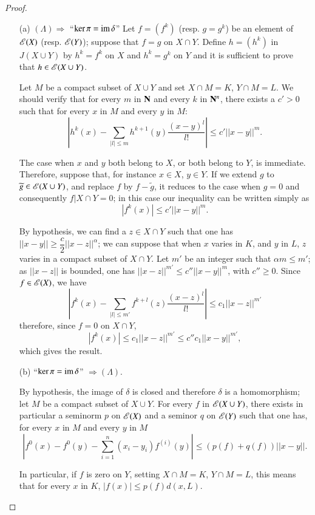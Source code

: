 \begin{proof}
\begin{itemize}
\item[(a)] $(\Lambda)\Rightarrow$ ``$\ker \pi=\operatorname{im} \delta$'' Let $f=(f^{k})$ (resp. $g=g^{k}$) be an element of $\mathscr{E}(X)$ (resp. $\mathscr{E}(Y)$); suppose that $f=g$ on $X\cap Y$. Define $h=(h^{k})$ in $J(X\cup Y)$ by $h^{k}=f^{k}$ on $X$ and $h^{k}=g^{k}$ on $Y$ and it is sufficient to prove that $h\in \mathscr{E}(X\cup Y)$.

Let $M$ be a compact subset of $X\cup Y$ and set $X\cap M=K$, $Y\cap M=L$. We should verify that for every $m$ in $\mathbf{N}$ and every $k$ in $\mathbf{N}^{n}$, there exists a $c'>0$ such that for every $x$ in $M$ and every $y$ in $M$:
$$
\left|h^{k}(x)-\sum\limits_{|l|\leq m}h^{k+1}(y)\dfrac{(x-y)^{l}}{l!}\right|\leq c'||x-y||^{m}.
$$

The case when $x$ and $y$ both belong to $X$, or both belong to $Y$, is immediate. Therefore, suppose that, for instance $x\in X$, $y\in Y$. If we extend $g$ to $\widetilde{g}\in \mathscr{E}(X\cup Y)$, and replace $f$ by $f-\widetilde{g}$, it reduces to the case when $g=0$ and consequently $f|X\cap Y=0$; in this case our inequality can be written simply as
$$
|f^{k}(x)|\leq c'||x-y||^{m}.
$$

By hypothesis, we can find a $z\in X\cap Y$ such that one has $||x-y||\geq \dfrac{c}{2}||x-z||^{\alpha}$; we can suppose that when $x$ varies in $K$, and $y$ in $L$, $z$ varies in a compact subset of $X\cap Y$. Let $m'$ be an integer such that $\alpha m\leq m'$; as $||x-z||$ is bounded, one has $||x-z||^{m'}\leq c''||x-y||^{m}$, with $c''\geq 0$. Since $f\in \mathscr{E}(X)$, we have
$$
\left|f^{k}(x)-\sum\limits_{|l|\leq m'}f^{k+l}(z)\dfrac{(x-z)^{l}}{l!}\right|\leq c_{1}||x-z||^{m'}
$$
therefore, since $f=0$ on $X\cap Y$,
$$
|f^{k}(x)|\leq c_{1}||x-z||^{m'}\leq c''c_{1}||x-y||^{m'},
$$
which gives the result.

\item[(b)] ``$\ker \pi =\operatorname{im} \delta$'' $\Rightarrow (\Lambda)$.

By hypothesis, the image of $\delta$ is closed and therefore $\delta$ is a homomorphism; let $M$ be a compact subset of $X\cup Y$. For every $f$ in $\mathscr{E}(X\cup Y)$, there exists in particular a seminorm $p$ on $\mathscr{E}(X)$ and a seminor $q$ on $\mathscr{E}(Y)$ such that one has, for every $x$ in $M$ and every $y$ in $M$
$$
\left| f^{0}(x)-f^{0}(y)-\sum\limits^{n}_{i=1}(x_{i}-y_{i})f^{(i)}(y)\right|\leq (p(f)+q(f))||x-y||.
$$

In particular, if $f$ is zero on $Y$, setting $X\cap M=K$, $Y\cap M=L$, this means that for every $x$ in $K$, $|f(x)|\leq p(f)d(x,L)$.


\end{itemize}
\end{proof}
